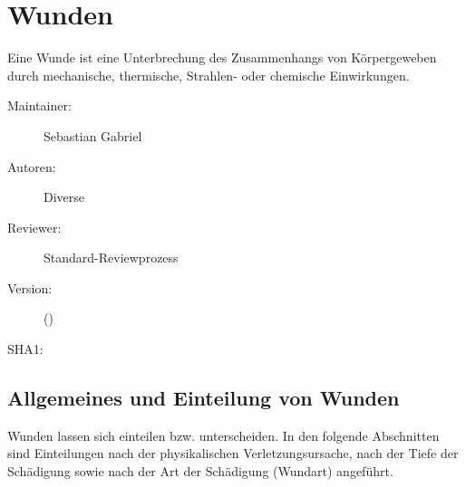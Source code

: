 \def\ChapterCode{WUN}
% 
\chapter
[\CO{[WUN]} Wunden]
{Wunden}
\label{chp:WUN}

\ChapterIntro
{%
 Eine Wunde ist eine Unterbrechung des
Zusammenhangs von Körpergeweben durch mechanische,
thermische, Strahlen- oder chemische Einwirkungen.
}
{%
\begin{description}
  \item[Maintainer:] Sebastian Gabriel
  \item[Autoren:] Diverse
  \item[Reviewer:] Standard-Reviewprozess
  \item[Version:] {\DocVersion} ({\DocVersionInfo})
  \item[SHA1:] {\DocGitCommit}
\end{description}

{\TxTeilkapitelAASS}
}


\clearpage




\section{Allgemeines und Einteilung von Wunden}

\label{topic:wunden-einteilung}%
\label{topic:wunden}%
%

Wunden lassen sich 
einteilen bzw. unterscheiden. In den folgende Abschnitten
sind Einteilungen nach der physikalischen
Verletzungsursache, nach der Tiefe der Schädigung sowie nach
der Art der Schädigung (Wundart) angeführt.




